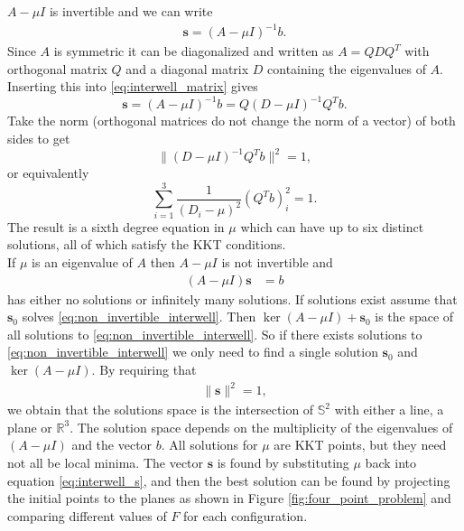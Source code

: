 $A-\mu I$ is invertible and we can write
%
\begin{align}
\textbf{s} = (A-\mu I)^{-1}b.
\end{align}
%
Since $A$ is symmetric it can be diagonalized and written as $A = QDQ^T$ with
orthogonal matrix $Q$ and a diagonal matrix $D$ containing the eigenvalues of $A$. 
Inserting this into \eqref{eq:interwell_matrix} gives
%
\begin{equation}
\textbf{s} = (A-\mu I)^{-1}b = Q(D-\mu I)^{-1}Q^Tb.
\label{eq:interwell_s}
\end{equation}
%
Take the norm (orthogonal matrices do not change the norm of a vector) of both sides to get
%
\begin{equation}
\| (D-\mu I)^{-1}Q^Tb \|^2= 1,
\end{equation}
%
or equivalently 
%
\begin{equation}
\sum_{i=1}^3 \frac{1}{(D_i-\mu)^2} (Q^Tb)_i^2 = 1.
\label{eq:six_degree_poly}
\end{equation}
%
The result is a sixth degree equation in $\mu$ which can have up to six distinct solutions,
all of which satisfy the KKT conditions.\\
%
If $\mu$ is an eigenvalue of $A$ then $A-\mu I$ is not
invertible and
%
\begin{align}
(A-\mu I)\textbf{s} &= b
\label{eq:non_invertible_interwell}
\end{align}
%
has either no solutions or infinitely many solutions. If solutions exist 
assume that $\textbf{s}_0$ solves \eqref{eq:non_invertible_interwell}. Then
$\ker(A-\mu I) + \textbf{s}_0$ is the space of all solutions to \eqref{eq:non_invertible_interwell}.
%
So if there exists solutions to \eqref{eq:non_invertible_interwell} we
only need to find a single solution $\textbf{s}_0$ and $\ker(A-\mu I)$.
By requiring that
%
\begin{align}
\| \textbf{s} \|^2 = 1,
\end{align}
%
we obtain that the solutions space is the intersection of $\mathbb{S}^2$ with either
a line, a plane or $\mathbb{R}^3$. The solution space depends on the multiplicity of
the eigenvalues of $(A-\mu I)$ and the vector $b$.
%
%
All solutions for $\mu$ are KKT points, but they need not all be local minima. 
The vector $\textbf{s}$ is found by substituting $\mu$ back into equation 
\eqref{eq:interwell_s}, and then the best solution can be found by projecting 
the initial points to the planes as shown in Figure \ref{fig:four_point_problem} and 
comparing different values of $F$ for each configuration.
%
%
%
